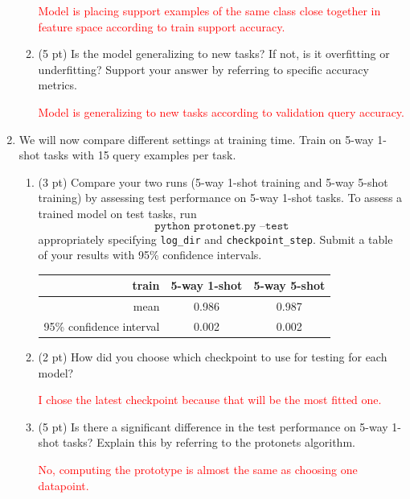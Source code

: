 \documentclass[12pt]{article}
\begin{document}
\begin{enumerate}
\begin{enumerate}[label=(\alph*)]
            \textcolor{red}{Model is placing support examples of the same class close together in feature space according to train support accuracy.}


            \item (5 pt) Is the model generalizing to new tasks? If not, is it overfitting or underfitting? Support your answer by referring to specific accuracy metrics.

            \textcolor{red}{Model is generalizing to new tasks according to validation query accuracy.}

        \end{enumerate}

        \newpage
        \item We will now compare different settings at training time. Train on 5-way 1-shot tasks with 15 query examples per task.
        \begin{enumerate}
            \item (3 pt) Compare your two runs (5-way 1-shot training and 5-way 5-shot training) by assessing test performance on 5-way 1-shot tasks. To assess a trained model on test tasks, run
            \begin{equation*}
                \texttt{python protonet.py --test}
            \end{equation*}
            appropriately specifying \texttt{log\_dir} and \texttt{checkpoint\_step}. Submit a table of your results with 95\% confidence intervals.

            \begin{tabular}{r|cc}
                train                    & 5-way 1-shot & 5-way 5-shot \\\hline
                mean                     & 0.986        & 0.987        \\
                95\% confidence interval & 0.002        & 0.002        \\
            \end{tabular}

            \item (2 pt) How did you choose which checkpoint to use for testing for each model?

            \textcolor{red}{I chose the latest checkpoint because that will be the most fitted one.}

            \item (5 pt) Is there a significant difference in the test performance on 5-way 1-shot tasks? Explain this by referring to the protonets algorithm.

            \textcolor{red}{No, computing the prototype is almost the same as choosing one datapoint.}

        \end{enumerate}


    \end{enumerate}
\end{document}
